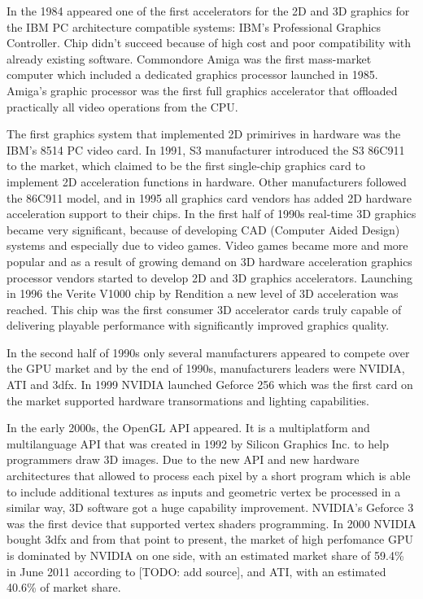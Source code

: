 \documentclass[thesis=M,english]{FITthesis}[2011/07/15]
\begin{document}
In the 1984 appeared one of the first accelerators for the 2D and 3D graphics for the IBM PC architecture compatible systems: IBM's Professional Graphics Controller. Chip didn't succeed because of high cost and poor compatibility with already existing software. Commondore Amiga was the first mass-market computer which included a dedicated graphics processor launched in 1985. Amiga's graphic processor was the first full graphics accelerator that offloaded practically all video operations from the CPU.

The first graphics system that implemented 2D primirives in hardware was the IBM's 8514 PC video card. In 1991, S3 manufacturer introduced the S3 86C911 to the market, which claimed to be the first single-chip graphics card to implement 2D acceleration functions in hardware. Other manufacturers followed the 86C911 model, and in 1995 all graphics card vendors has added 2D hardware acceleration support to their chips. In the first half of 1990s real-time 3D graphics became very significant, because of developing CAD (Computer Aided Design) systems and especially due to video games. Video games became more and more popular and as a result of growing demand on 3D hardware acceleration graphics processor vendors started to develop 2D and 3D graphics accelerators. Launching in 1996 the Verite V1000 chip by Rendition a new level of 3D acceleration was reached. This chip was the first consumer 3D accelerator cards truly capable of delivering playable performance with significantly improved graphics quality.

In the second half of 1990s only several manufacturers appeared to compete over the GPU market and by the end of 1990s, manufacturers leaders were NVIDIA, ATI and 3dfx. In 1999 NVIDIA launched Geforce 256 which was the first card on the market supported hardware transormations and lighting capabilities. 

In the early 2000s, the OpenGL API appeared. It is a multiplatform and multilanguage API that was created in 1992 by Silicon Graphics Inc. to help programmers draw 3D images. Due to the new API and new hardware architectures that allowed to process each pixel by a short program which is able to include additional textures as inputs and geometric vertex be processed in a similar way, 3D software got a huge capability improvement. NVIDIA's Geforce 3 was the first device that supported vertex shaders programming. In 2000 NVIDIA bought 3dfx and from that point to present, the market of high perfomance GPU is dominated by NVIDIA on one side, with an estimated market share of 59.4\% in June 2011 according to [TODO: add source], and ATI, with an estimated 40.6\% of market share.
\end{document}
